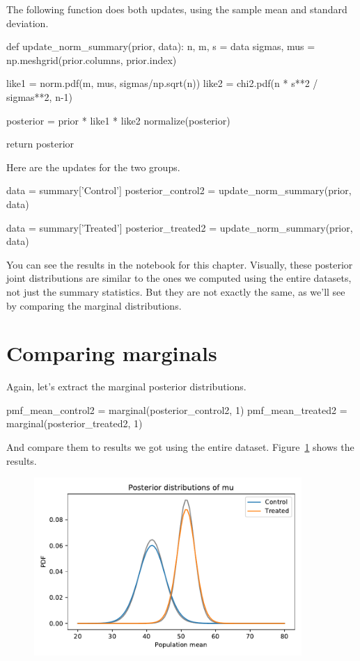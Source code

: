 \documentclass[12pt]{book}
\theoremstyle{exercise}
\begin{document}
The following function does both updates, using the sample mean and
standard deviation.

\begin{code}
def update_norm_summary(prior, data):
    n, m, s = data
    sigmas, mus = np.meshgrid(prior.columns, prior.index)

    like1 = norm.pdf(m, mus, sigmas/np.sqrt(n))
    like2 = chi2.pdf(n * s**2 / sigmas**2, n-1)

    posterior = prior * like1 * like2
    normalize(posterior)

    return posterior
\end{code}

Here are the updates for the two groups.

\begin{code}
data = summary['Control']
posterior_control2 = update_norm_summary(prior, data)

data = summary['Treated']
posterior_treated2 = update_norm_summary(prior, data)
\end{code}

You can see the results in the notebook for this chapter.
Visually, these posterior joint distributions are similar to the ones we
computed using the entire datasets, not just the summary statistics.
But they are not exactly the same, as we'll see by comparing the marginal
distributions.

\section{Comparing marginals}

Again, let's extract the marginal posterior distributions.

\begin{code}
pmf_mean_control2 = marginal(posterior_control2, 1)
pmf_mean_treated2 = marginal(posterior_treated2, 1)
\end{code}

And compare them to results we got using the entire dataset.
Figure~\ref{fig11-05} shows the results.

\begin{figure}
\centerline{\includegraphics[width=4in]{figs/fig11-05.pdf}}
\caption{}
\label{fig11-05}
\end{figure}
\end{document}
